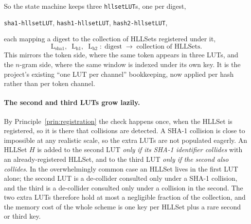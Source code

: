 \documentclass[11pt,a4paper]{article}
\theoremstyle{remark}
\begin{document}
So the state machine keeps three \texttt{hllsetLUT}s, one per digest,
\begin{center}
\texttt{sha1-hllsetLUT}, \quad \texttt{hash1-hllsetLUT}, \quad
\texttt{hash2-hllsetLUT},
\end{center}
each mapping a digest to the collection of HLLSets registered under it,
\begin{equation}
  \label{eq:lut}
  \mathrm{L}_\text{sha1},\;\; \mathrm{L}_\text{h1},\;\; \mathrm{L}_\text{h2}
  \;:\; \text{digest} \;\longrightarrow\; \text{collection of HLLSets}.
\end{equation}
This mirrors the token side, where the same token appears in three LUTs, and the
$n$-gram side, where the same window is indexed under its own key. It is the
project's existing ``one LUT per channel'' bookkeeping, now applied per hash
rather than per token channel.

\paragraph{The second and third LUTs grow lazily.} By
Principle~\ref{prin:registration} the check happens once, when the HLLSet is
registered, so it is there that collisions are detected. A SHA-1 collision is
close to impossible at any realistic scale, so the extra LUTs are not populated
eagerly. An HLLSet $H$ is added to the second LUT \emph{only if its SHA-1
identifier collides} with an already-registered HLLSet, and to the third LUT
\emph{only if the second also collides}. In the overwhelmingly common case an
HLLSet lives in the first LUT alone; the second LUT is a de-collider consulted
only under a SHA-1 collision, and the third is a de-collider consulted only
under a collision in the second. The two extra LUTs therefore hold at most a
negligible fraction of the collection, and the memory cost of the whole scheme
is one key per HLLSet plus a rare second or third key.
\end{document}

